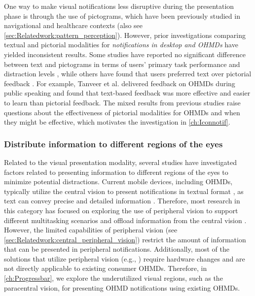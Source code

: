 One way to make visual notifications less disruptive during the presentation phase is through the use of pictograms, which have been previously studied in navigational \cite{ells_rapid_1979, camacho_icons_1990, houts_role_2006} and healthcare \cite{houts_role_2006, leos_toro_perceptions_2019} contexts (also see \autoref{sec:Relatedwork:pattern_perception}). However, prior investigations comparing textual and pictorial modalities for \textit{notifications in desktop and OHMDs} have yielded inconsistent results. Some studies have reported no significant difference between text and pictograms in terms of users' primary task performance and distraction levels \cite{warnock_multiple_2013, warnock_subjective_2011}, while others have found that users preferred text over pictorial feedback \cite{tanveer_rhema_2015, somervell_evaluating_2002}. For example, Tanveer et al. \cite{tanveer_rhema_2015} delivered feedback on OHMDs during public speaking and found that text-based feedback was more effective and easier to learn than pictorial feedback. The mixed results from previous studies raise questions about the effectiveness of pictorial modalities for OHMDs and when they might be effective, which motivates the investigation in \autoref{ch:Iconnotif}.


\subsubsection*{Distribute information to different regions of the eyes}
\label{sec:Relatedwork:ohmd_notification:visual_regions}

Related to the visual presentation modality, several studies have investigated factors related to presenting information to different regions of the eyes to minimize potential distractions. Current mobile devices, including OHMDs, typically utilize the central vision to present notifications in textual format \cite{android_android_2021}, as text can convey precise and detailed information \cite{theios_theoretical_1989, wiedenbeck_use_1999}. Therefore, most research in this category has focused on exploring the use of peripheral vision to support different multitasking scenarios and offload information from the central vision \cite{chaturvedi_peripheral_2019, ishiguro_peripheral_2011, gruenefeld_guiding_2018, luyten_hidden_2016, poppinga_ambiglasses_2012, costanza_eye_q_2006, nakuo_smart_2016, ku_peritext_2019}. However, the limited capabilities of peripheral vision (see \autoref{sec:Relatedwork:central_peripheral_vision}) restrict the amount of information that can be presented in peripheral notifications. Additionally, most of the solutions that utilize peripheral vision (e.g., \cite{nakuo_smart_2016, gruenefeld_guiding_2018, costanza_eye_q_2006}) require hardware changes and are not directly applicable to existing consumer OHMDs. Therefore, in \autoref{ch:Progressbar}, we explore the underutilized visual regions, such as the paracentral vision, for presenting OHMD notifications using existing OHMDs.

